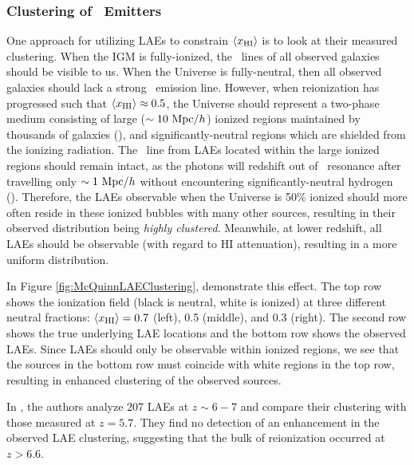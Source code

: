 \subsubsection{Clustering of \lya\ Emitters}

One approach for utilizing LAEs to constrain $\langle x_{\text{HI}}\rangle$ is to look at their measured clustering. When the IGM is fully-ionized, the \lya\ lines of all observed galaxies should be visible to us. When the Universe is fully-neutral, then all observed galaxies should lack a strong \lya\ emission line. However, when reionization has progressed such that $\langle x_{\text{HI}}\rangle \approx 0.5$, the Universe should represent a two-phase medium consisting of large ($\sim 10\ \text{Mpc/$h$}$) ionized regions maintained by thousands of galaxies (\citealt{McQuinn:2007dy}), and significantly-neutral regions which are shielded from the ionizing radiation. The \lya\ line from LAEs located within the large ionized regions should remain intact, as the photons will redshift out of \lya\ resonance after travelling only $\sim 1\ \text{Mpc/$h$}$ without encountering significantly-neutral hydrogen (\citealt{finlator2012recent}). Therefore, the LAEs observable when the Universe is 50\% ionized should more often reside in these ionized bubbles with many other sources, resulting in their observed distribution being \textit{highly clustered}. Meanwhile, at lower redshift, all LAEs should be observable (with regard to HI attenuation), resulting in a more uniform distribution.

In Figure \ref{fig:McQuinnLAEClustering}, \cite{McQuinn:2007dy} demonstrate this effect. The top row shows the ionization field (black is neutral, white is ionized) at three different neutral fractions: $\langle x_{\text{HI}}\rangle = 0.7$ (left), 0.5 (middle), and 0.3 (right). The second row shows the true underlying LAE locations and the bottom row shows the observed LAEs. Since LAEs should only be observable within ionized regions, we see that the sources in the bottom row must coincide with white regions in the top row, resulting in enhanced clustering of the observed sources.

In \cite{Ouchi2010}, the authors analyze 207 LAEs at $z \sim 6-7$ and compare their clustering with those measured at $z = 5.7$. They find no detection of an enhancement in the observed LAE clustering, suggesting that the bulk of reionization occurred at $z > 6.6$. 



